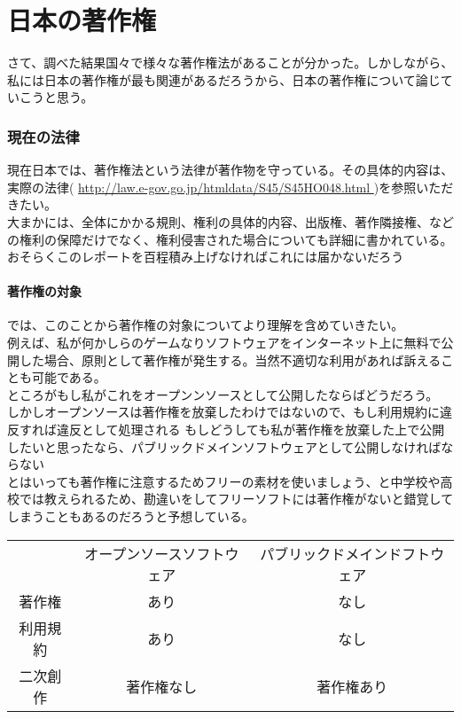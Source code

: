 \documentclass[a4j]{jsarticle}
\begin{document}
\part{日本の著作権}
さて、調べた結果国々で様々な著作権法があることが分かった。しかしながら、私には日本の著作権が最も関連があるだろうから、日本の著作権について論じていこうと思う。
\section{現在の法律}
現在日本では、著作権法という法律が著作物を守っている。その具体的内容は、実際の法律( \url{ http://law.e-gov.go.jp/htmldata/S45/S45HO048.html } )を参照いただきたい。\\
大まかには、全体にかかる規則、権利の具体的内容、出版権、著作隣接権、などの権利の保障だけでなく、権利侵害された場合についても詳細に書かれている。おそらくこのレポートを百程積み上げなければこれには届かないだろう
\subsection*{著作権の対象}
では、このことから著作権の対象についてより理解を含めていきたい。\\
例えば、私が何かしらのゲームなりソフトウェアをインターネット上に無料で公開した場合、原則として著作権が発生する。当然不適切な利用があれば訴えることも可能である。\\
ところがもし私がこれをオープンンソースとして公開したならばどうだろう。\\
しかしオープンソースは著作権を放棄したわけではないので、もし利用規約に違反すれば違反として処理される\cite{def_oss} 
もしどうしても私が著作権を放棄した上で公開したいと思ったなら、パブリックドメインソフトウェアとして公開しなければならない \cite{det_pds} \\
 とはいっても著作権に注意するためフリーの素材を使いましょう、と中学校や高校では教えられるため、勘違いをしてフリーソフトには著作権がないと錯覚してしまうこともあるのだろうと予想している。\\
\begin{center}
 \begin{tabular}{|c|c|c|} %
 &オープンソースソフトウェア &パブリックドメインドフトウェア \\
 著作権&あり &なし \\
 利用規約&あり &なし \\
 二次創作&著作権なし &著作権あり \\
 \end{tabular} \cite{def_diff}
 \end{center}
\end{document}
